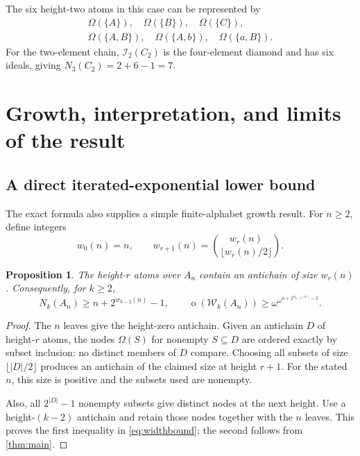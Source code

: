 \documentclass[11pt,letterpaper]{article}
\newtheorem{proposition}[proposition]{Proposition}
\theoremstyle{definition}
\theoremstyle{remark}
\newcommand{\W}{\mathcal W}
\newcommand{\I}{\mathcal I}
\newcommand{\otp}{\operatorname{o}}
\begin{document}
The six height-two atoms in this case can be represented by
\[
\begin{gathered}
  \Omega(\{A\}),\quad \Omega(\{B\}),\quad \Omega(\{C\}),\\
  \Omega(\{A,B\}),\quad \Omega(\{A,b\}),\quad \Omega(\{a,B\}).
\end{gathered}
\]
For the two-element chain, $\I_2(C_2)$ is the four-element diamond and
has six ideals, giving $N_3(C_2)=2+6-1=7$.

\section{Growth, interpretation, and limits of the result}\label{sec:scope}

\subsection{A direct iterated-exponential lower bound}

The exact formula also supplies a simple finite-alphabet growth result.
For $n\ge2$, define integers
\[
  w_0(n)=n,\qquad
  w_{r+1}(n)=\binom{w_r(n)}{\lfloor w_r(n)/2\rfloor}.
\]

\begin{proposition}\label{prop:width}
The height-$r$ atoms over $A_n$ contain an antichain of size $w_r(n)$.
Consequently, for $k\ge2$,
\begin{equation}\label{eq:widthbound}
 N_k(A_n)\ge n+2^{w_{k-2}(n)}-1,
 \qquad
 \otp(\W_k(A_n))\ge
 \omega^{\omega^{n+2^{w_{k-2}(n)}-2}}.
\end{equation}
\end{proposition}

\begin{proof}
The $n$ leaves give the height-zero antichain. Given an antichain $D$ of
height-$r$ atoms, the nodes $\Omega(S)$ for nonempty $S\subseteq D$ are
ordered exactly by subset inclusion: no distinct members of $D$ compare.
Choosing all subsets of size $\lfloor|D|/2\rfloor$ produces an antichain
of the claimed size at height $r+1$. For the stated $n$, this size is
positive and the subsets used are nonempty.

Also, all $2^{|D|}-1$ nonempty subsets give distinct nodes at the next
height. Use a height-$(k-2)$ antichain and retain those nodes together with
the $n$ leaves. This proves the first inequality in \eqref{eq:widthbound};
the second follows from \cref{thm:main}.
\end{proof}
\end{document}
